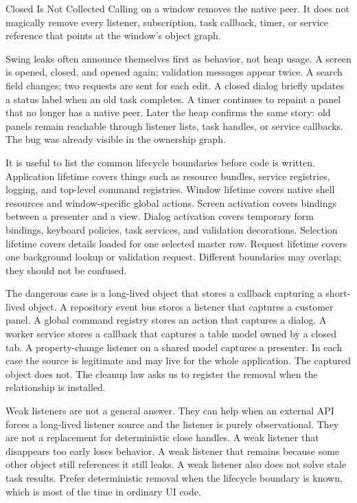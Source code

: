 \begin{pitfallbox}{Closed Is Not Collected}
Calling  on a window removes the native peer. It does not
magically remove every listener, subscription, task callback, timer, or service
reference that points at the window's object graph.
\end{pitfallbox}

Swing leaks often announce themselves first as behavior, not heap usage. A
screen is opened, closed, and opened again; validation messages appear twice.
A search field changes; two requests are sent for each edit. A closed dialog
briefly updates a status label when an old task completes. A timer continues to
repaint a panel that no longer has a native peer. Later the heap confirms the
same story: old panels remain reachable through listener lists, task handles,
or service callbacks. The bug was already visible in the ownership graph.

It is useful to list the common lifecycle boundaries before code is written.
Application lifetime covers things such as resource bundles, service
registries, logging, and top-level command registries. Window lifetime covers
native shell resources and window-specific global actions. Screen activation
covers bindings between a presenter and a view. Dialog activation covers
temporary form bindings, keyboard policies, task services, and validation
decorations. Selection lifetime covers details loaded for one selected master
row. Request lifetime covers one background lookup or validation request.
Different boundaries may overlap; they should not be confused.

The dangerous case is a long-lived object that stores a callback capturing a
short-lived object. A repository event bus stores a listener that captures a
customer panel. A global command registry stores an action that captures a
dialog. A worker service stores a callback that captures a table model owned by
a closed tab. A property-change listener on a shared model captures a
presenter. In each case the source is legitimate and may live for the whole
application. The captured object does not. The cleanup law asks us to register
the removal when the relationship is installed.

Weak listeners are not a general answer. They can help when an external API
forces a long-lived listener source and the listener is purely observational.
They are not a replacement for deterministic close handles. A weak listener
that disappears too early loses behavior. A weak listener that remains because
some other object still references it still leaks. A weak listener also does
not solve stale task results. Prefer deterministic removal when the lifecycle
boundary is known, which is most of the time in ordinary UI code.

